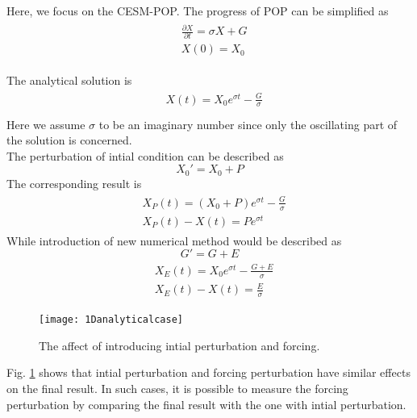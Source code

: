 \documentclass{sig-alternate}
\begin{document}
Here, we focus on the CESM-POP. 
The progress of POP can be simplified as 
\begin{eqnarray*}
\begin{aligned}
&\frac{\partial X}{\partial t} = \sigma X +G \\
&X(0) = X_0 
\end{aligned}
\end{eqnarray*}

The analytical solution is 
\begin{eqnarray*}
\begin{aligned}
&X(t) = X_0e^{\sigma t } -\frac{G}{\sigma} \\
\end{aligned}
\end{eqnarray*}
Here we assume $\sigma$ to be an imaginary number since only the oscillating part of the solution is concerned. \\
The perturbation of intial condition can be described as $$X_0' =X_0+P$$
The corresponding result is 
\begin{eqnarray*}
\begin{aligned}
&X_P(t) = (X_0+P)e^{\sigma t } -\frac{G}{\sigma} \\
&X_P(t)-X(t) = Pe^{\sigma t }
\end{aligned}
\end{eqnarray*}
While introduction of new numerical method would be described as $$G' = G + E$$
\begin{eqnarray*}
\begin{aligned}
&X_E(t) = X_0e^{\sigma t } -\frac{G+E}{\sigma} \\
&X_E(t)-X(t) = \frac{E}{\sigma}
\end{aligned}
\end{eqnarray*}

\begin{figure}[!htb]
\begin{center}
\texttt{[image: 1Danalyticalcase]}
\end{center}
\caption[] {The affect of introducing intial perturbation and forcing.}
\label{fig:1Danalytical}
\end{figure}

Fig. \ref{fig:1Danalytical} shows that intial perturbation and forcing perturbation have similar effects on the final result. In such cases, it is possible to measure the forcing perturbation by comparing the final result with the one with intial perturbation.
\end{document}
